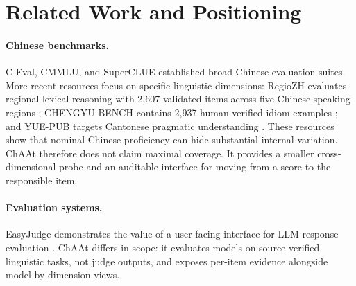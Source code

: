 \documentclass[11pt]{article}
\begin{document}
\section{Related Work and Positioning}

\paragraph{Chinese benchmarks.}
C-Eval, CMMLU, and SuperCLUE established broad Chinese evaluation suites. More recent resources focus on specific linguistic dimensions: RegioZH evaluates regional lexical reasoning with 2,607 validated items across five Chinese-speaking regions \citep{zheng-etal-2026-regiozh}; CHENGYU-BENCH contains 2,937 human-verified idiom examples \citep{fu-etal-2025-chengyu}; and YUE-PUB targets Cantonese pragmatic understanding \citep{wu-etal-2026-yue-pub}. These resources show that nominal Chinese proficiency can hide substantial internal variation. ChAAt therefore does not claim maximal coverage. It provides a smaller cross-dimensional probe and an auditable interface for moving from a score to the responsible item.

\paragraph{Evaluation systems.}
EasyJudge demonstrates the value of a user-facing interface for LLM response evaluation \citep{li-sun-2025-easyjudge}. ChAAt differs in scope: it evaluates models on source-verified linguistic tasks, not judge outputs, and exposes per-item evidence alongside model-by-dimension views.

\begin{table}[t]
\centering
\small
{}
\caption{Positioning against representative Chinese evaluation resources. Scale is not directly comparable because the systems target different scientific questions.}
\label{tab:related}
\end{table}
\end{document}
